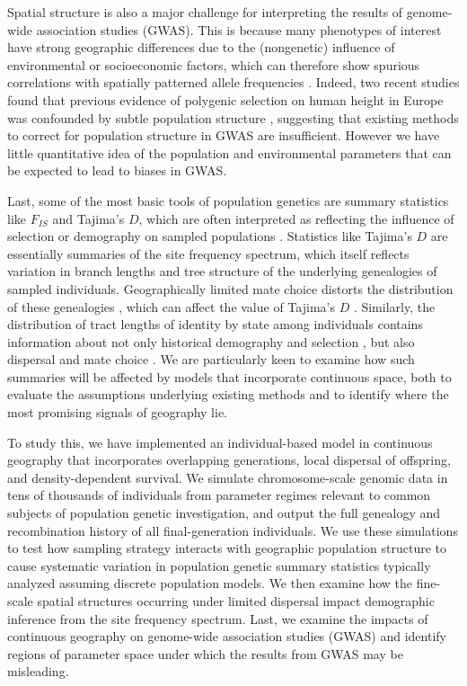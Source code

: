 \documentclass[10pt,twoside,lineno,hidelinks]{preprint}
\begin{document}
Spatial structure is also a major challenge for interpreting the results of genome-wide association studies (GWAS). This is because many phenotypes of interest have strong geographic differences due to the (nongenetic) influence of environmental or socioeconomic factors,
which can therefore show spurious correlations with spatially patterned allele frequencies \citep{Bulik-Sullivan2015,Mathieson2012}. Indeed, two recent studies found that previous evidence of polygenic selection on human height in Europe was confounded by subtle population structure \citep{Sohail2018,Berg2018}, suggesting that existing methods to correct for population structure in GWAS are insufficient. However we have little quantitative idea of the population and environmental parameters that can be expected to lead to biases in GWAS. 

Last, some of the most basic tools of population genetics are summary statistics like $F_{IS}$ and Tajima's $D$, which are often interpreted as reflecting the influence of selection or demography on sampled populations \citep{tajima1989statistical}. Statistics like Tajima's $D$ are essentially summaries of the site frequency spectrum, which itself reflects variation in branch lengths and tree structure of the underlying genealogies of sampled individuals. Geographically limited mate choice distorts the distribution of these genealogies \citep{Maruyama1972,Wakeley1999}, which can affect the value of Tajima's $D$ \citep{Stadler2009}. Similarly, the distribution of tract lengths of identity by state among individuals contains information about not only historical demography \citep{Harris2013,ralph2013geography} and selection \citep{Garud2015}, but also dispersal and mate choice \citep{Ringbauer2017,Baharian2016}. 
We are particularly keen to examine how such summaries will be affected by models that incorporate continuous space, both to evaluate the assumptions underlying existing methods and to identify where the most promising signals of geography lie.

To study this, we have implemented an individual-based model in continuous geography 
that incorporates overlapping generations, local dispersal of offspring, and density-dependent survival. 
We simulate chromosome-scale genomic data in tens of thousands of individuals from parameter regimes relevant to common subjects of population genetic investigation, and output the full genealogy and recombination history of all final-generation individuals. 
We use these simulations to test how sampling strategy interacts with geographic population structure to cause systematic variation in population genetic summary statistics 
typically analyzed assuming discrete population models. 
We then examine how the fine-scale spatial structures occurring under limited dispersal impact demographic inference from the site frequency spectrum. 
Last, we examine the impacts of continuous geography on genome-wide association studies (GWAS) and identify regions of parameter space under which the results from GWAS may be misleading.
\end{document}
